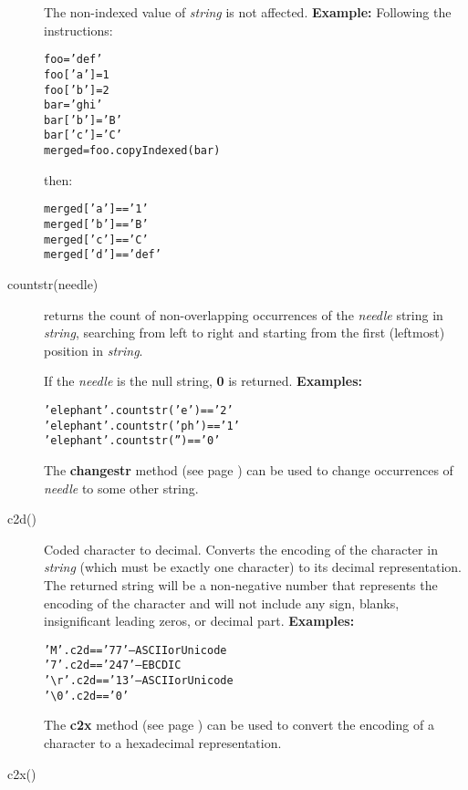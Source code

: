 \begin{description}
The non-indexed value of \emph{string} is not affected.
 \textbf{Example:}
 Following the instructions:
\begin{alltt}
foo='def'
foo['a']=1
foo['b']=2
bar='ghi'
bar['b']='B'
bar['c']='C'
merged=foo.copyIndexed(bar)
\end{alltt}
then:
\begin{alltt}
merged['a'] == '1'
merged['b'] == 'B'
merged['c'] == 'C'
merged['d'] == 'def'
\end{alltt}
\item[countstr(needle)]\label{refcoustr}

returns the count of non-overlapping occurrences of the
\emph{needle} string in \emph{string}, searching from left to
right and starting from the first (leftmost) position in
\emph{string}.
 
If the \emph{needle} is the null string, \textbf{0} is returned.
 \textbf{Examples:}
\begin{alltt}
'elephant'.countstr('e')  == '2'
'elephant'.countstr('ph') == '1'
'elephant'.countstr('')   == '0'
\end{alltt}
 The  \textbf{changestr} method (see page \pageref{refchastr})  can be used to
change occurrences of \emph{needle} to some other string.
\item[c2d()]\label{refc2d}

Coded character to decimal.
Converts the encoding of the character in \emph{string} (which must be
exactly one character) to its decimal representation.
The returned string will be a non-negative number that represents
the encoding of the character and will not include any sign, blanks,
insignificant leading zeros, or decimal part.
 \textbf{Examples:}
\begin{alltt}
'M'.c2d  == '77'  -- ASCII or Unicode
'7'.c2d  == '247' -- EBCDIC
'\textbackslash r'.c2d == '13'  -- ASCII or Unicode
'\textbackslash 0'.c2d == '0'
\end{alltt}
 The  \textbf{c2x} method (see page \pageref{refc2x})  can be used to
convert the encoding of a character to a hexadecimal representation.
\item[c2x()]\label{refc2x}


\end{description}
